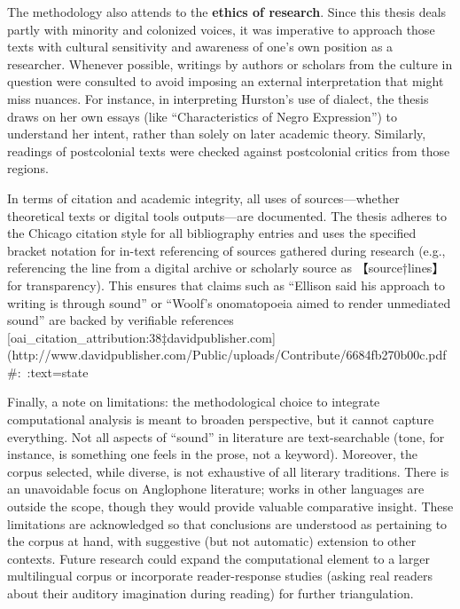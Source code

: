\documentclass[12pt]{report}
\begin{document}
The methodology also attends to the \textbf{ethics of research}. Since this thesis deals partly with minority and colonized voices, it was imperative to approach those texts with cultural sensitivity and awareness of one’s own position as a researcher. Whenever possible, writings by authors or scholars from the culture in question were consulted to avoid imposing an external interpretation that might miss nuances. For instance, in interpreting Hurston’s use of dialect, the thesis draws on her own essays (like “Characteristics of Negro Expression”) to understand her intent, rather than solely on later academic theory. Similarly, readings of postcolonial texts were checked against postcolonial critics from those regions.

In terms of citation and academic integrity, all uses of sources—whether theoretical texts or digital tools outputs—are documented. The thesis adheres to the Chicago citation style for all bibliography entries and uses the specified bracket notation for in-text referencing of sources gathered during research (e.g., referencing the line from a digital archive or scholarly source as 【source†lines】 for transparency). This ensures that claims such as “Ellison said his approach to writing is through sound” or “Woolf’s onomatopoeia aimed to render unmediated sound” are backed by verifiable references [oai_citation_attribution:38‡davidpublisher.com](http://www.davidpublisher.com/Public/uploads/Contribute/6684fb270b00c.pdf#:~:text=state%

Finally, a note on limitations: the methodological choice to integrate computational analysis is meant to broaden perspective, but it cannot capture everything. Not all aspects of “sound” in literature are text-searchable (tone, for instance, is something one feels in the prose, not a keyword). Moreover, the corpus selected, while diverse, is not exhaustive of all literary traditions. There is an unavoidable focus on Anglophone literature; works in other languages are outside the scope, though they would provide valuable comparative insight. These limitations are acknowledged so that conclusions are understood as pertaining to the corpus at hand, with suggestive (but not automatic) extension to other contexts. Future research could expand the computational element to a larger multilingual corpus or incorporate reader-response studies (asking real readers about their auditory imagination during reading) for further triangulation.
\end{document}
